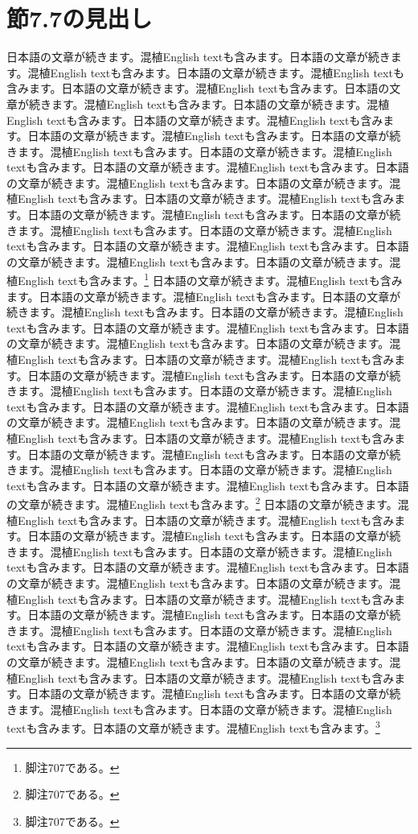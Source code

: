\documentclass[pdflatex,book]{jlreq}
\begin{document}
\section{節7.7の見出し}
日本語の文章が続きます。混植English textも含みます。日本語の文章が続きます。混植English textも含みます。日本語の文章が続きます。混植English textも含みます。日本語の文章が続きます。混植English textも含みます。日本語の文章が続きます。混植English textも含みます。日本語の文章が続きます。混植English textも含みます。日本語の文章が続きます。混植English textも含みます。日本語の文章が続きます。混植English textも含みます。日本語の文章が続きます。混植English textも含みます。日本語の文章が続きます。混植English textも含みます。日本語の文章が続きます。混植English textも含みます。日本語の文章が続きます。混植English textも含みます。日本語の文章が続きます。混植English textも含みます。日本語の文章が続きます。混植English textも含みます。日本語の文章が続きます。混植English textも含みます。日本語の文章が続きます。混植English textも含みます。日本語の文章が続きます。混植English textも含みます。日本語の文章が続きます。混植English textも含みます。日本語の文章が続きます。混植English textも含みます。日本語の文章が続きます。混植English textも含みます。\footnote{脚注707である。}
日本語の文章が続きます。混植English textも含みます。日本語の文章が続きます。混植English textも含みます。日本語の文章が続きます。混植English textも含みます。日本語の文章が続きます。混植English textも含みます。日本語の文章が続きます。混植English textも含みます。日本語の文章が続きます。混植English textも含みます。日本語の文章が続きます。混植English textも含みます。日本語の文章が続きます。混植English textも含みます。日本語の文章が続きます。混植English textも含みます。日本語の文章が続きます。混植English textも含みます。日本語の文章が続きます。混植English textも含みます。日本語の文章が続きます。混植English textも含みます。日本語の文章が続きます。混植English textも含みます。日本語の文章が続きます。混植English textも含みます。日本語の文章が続きます。混植English textも含みます。日本語の文章が続きます。混植English textも含みます。日本語の文章が続きます。混植English textも含みます。日本語の文章が続きます。混植English textも含みます。日本語の文章が続きます。混植English textも含みます。日本語の文章が続きます。混植English textも含みます。\footnote{脚注707である。}
日本語の文章が続きます。混植English textも含みます。日本語の文章が続きます。混植English textも含みます。日本語の文章が続きます。混植English textも含みます。日本語の文章が続きます。混植English textも含みます。日本語の文章が続きます。混植English textも含みます。日本語の文章が続きます。混植English textも含みます。日本語の文章が続きます。混植English textも含みます。日本語の文章が続きます。混植English textも含みます。日本語の文章が続きます。混植English textも含みます。日本語の文章が続きます。混植English textも含みます。日本語の文章が続きます。混植English textも含みます。日本語の文章が続きます。混植English textも含みます。日本語の文章が続きます。混植English textも含みます。日本語の文章が続きます。混植English textも含みます。日本語の文章が続きます。混植English textも含みます。日本語の文章が続きます。混植English textも含みます。日本語の文章が続きます。混植English textも含みます。日本語の文章が続きます。混植English textも含みます。日本語の文章が続きます。混植English textも含みます。日本語の文章が続きます。混植English textも含みます。\footnote{脚注707である。}
\end{document}
